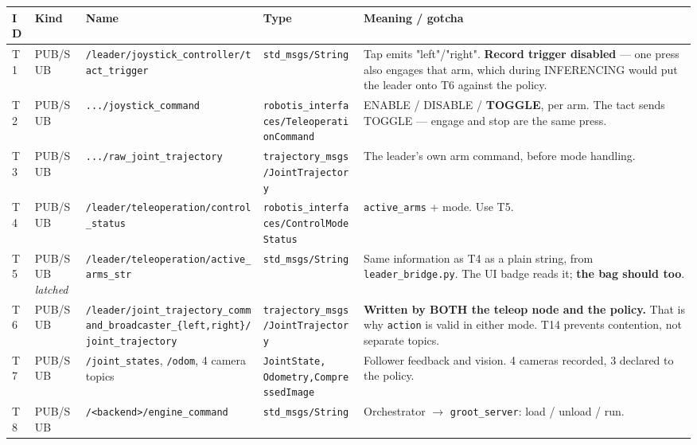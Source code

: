 \documentclass{article}
\begin{document}
{\renewcommand{\arraystretch}{1.35}
\begin{longtable}{p{9mm}p{24mm}p{76mm}p{50mm}p{196mm}}
\hline
\textbf{ID} & \textbf{Kind} & \textbf{Name} & \textbf{Type} & \textbf{Meaning / gotcha}\\
\hline
\endhead
T1 & \small PUB/SUB & \texttt{\small /leader/joystick\_controller/\allowbreak tact\_trigger} & \texttt{\small std\_msgs/String} & \small Tap emits "left"/"right". \textbf{Record trigger disabled} --- one press also engages that arm, which during INFERENCING would put the leader onto T6 against the policy.\\
T2 & \small PUB/SUB & \texttt{\small .../joystick\_command} & \texttt{\small robotis\_interfaces/\allowbreak TeleoperationCommand} & \small ENABLE / DISABLE / \textbf{TOGGLE}, per arm. The tact sends TOGGLE --- engage and stop are the same press.\\
T3 & \small PUB/SUB & \texttt{\small .../raw\_joint\_trajectory} & \texttt{\small trajectory\_msgs/\allowbreak JointTrajectory} & \small The leader's own arm command, before mode handling.\\
T4 & \small PUB/SUB & \texttt{\small /leader/teleoperation/\allowbreak control\_status} & \texttt{\small robotis\_interfaces/\allowbreak ControlModeStatus} & \small \texttt{active\_arms} + mode. Use T5.\\
T5 & \small PUB/SUB \emph{latched} & \texttt{\small /leader/teleoperation/\allowbreak active\_arms\_str} & \texttt{\small std\_msgs/String} & \small Same information as T4 as a plain string, from \texttt{leader\_bridge.py}. The UI badge reads it; \textbf{the bag should too}.\\
T6 & \small PUB/SUB & \texttt{\small /leader/joint\_trajectory\_command\_\allowbreak broadcaster\_\{left,right\}/\allowbreak joint\_trajectory} & \texttt{\small trajectory\_msgs/\allowbreak JointTrajectory} & \small \textbf{Written by BOTH the teleop node and the policy.} That is why \texttt{action} is valid in either mode. T14 prevents contention, not separate topics.\\
T7 & \small PUB/SUB & \texttt{\small /joint\_states}, \texttt{\small /odom}, 4 camera topics & \texttt{\small JointState, Odometry,\allowbreak CompressedImage} & \small Follower feedback and vision. 4 cameras recorded, 3 declared to the policy.\\
T8 & \small PUB/SUB & \texttt{\small /<backend>/engine\_command} & \texttt{\small std\_msgs/String} & \small Orchestrator $\to$ \texttt{groot\_server}: load / unload / run.\\

\end{longtable}}
\end{document}
